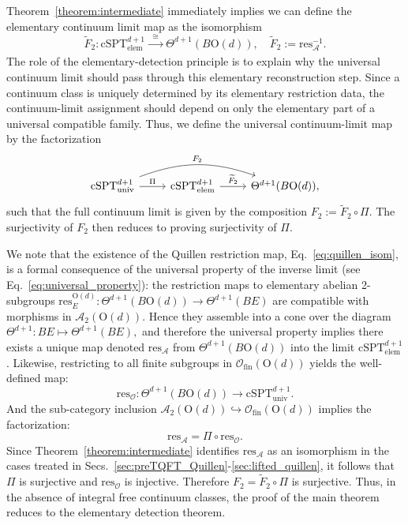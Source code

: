 \documentclass[aps,prx,reprint,superscriptaddress,twocolumn,amsmath,amssymb,amsfonts, nofootinbib]{revtex4-2}
\newcommand{\ofin}{\mathcal{O}_{\text{fin}}}
\newcommand{\qa}{\mathcal{A}_{2}}
\newcommand{\res}{\text{res}}
\theoremstyle{apsstyle}
\begin{document}
Theorem~\ref{theorem:intermediate} immediately implies we can define the elementary continuum limit map as the isomorphism
\begin{equation*}
\widetilde{F}_{2}: \mathrm{cSPT}^{d+1}_{\mathrm{elem}} \xrightarrow[]{\;\;\cong\;\;} \Theta^{d+1}(B\mathrm{O}(d)),\quad \widetilde{F}_{2}:= \res_{\mathcal{A}}^{-1}.
\end{equation*}
The role of the elementary-detection principle is to explain why the universal continuum limit should pass through this elementary reconstruction step. Since a continuum class is uniquely determined by its elementary restriction data, the continuum-limit assignment should depend on only the elementary part of a universal compatible family. Thus, we define the universal continuum-limit map by the factorization
\begin{equation}
\begin{tikzcd}
         \mathrm{cSPT}^{d+1}_{\mathrm{univ}} \arrow[r, "\Pi"] \arrow[rr,bend left=20,"F_{2}"]
        &\mathrm{cSPT}^{d+1}_{\mathrm{elem}} \arrow[r, " \widetilde{F}_{2}"] & \Theta^{d+1}(B\mathrm{O}(d)),
    \end{tikzcd}
    \label{eq:factorization}
\end{equation}
such that the full continuum limit is given by the composition $ F_{2}:= \widetilde{F}_{2}\circ \Pi$. 
The surjectivity of $F_{2}$ then reduces to proving surjectivity of $\Pi$.

\bigskip 

We note that the existence of the Quillen restriction map, Eq.~\ref{eq:quillen_isom}, is a formal consequence of the universal property of the inverse limit (see Eq.~\ref{eq:universal_property}): the restriction maps to elementary abelian 2-subgroups $\res^{\mathrm{O}(d)}_{E}: \Theta^{d+1}(B\mathrm{O}(d)) \to \Theta^{d+1}(BE)$ are compatible with morphisms in $\mathcal{A}_{2}(\mathrm{O}(d))$. Hence they assemble into a cone over the diagram $\Theta^{d+1}: BE\mapsto \Theta^{d+1}(BE),$ and therefore the universal property implies there exists a unique map denoted $\res_{\mathcal{A}}$ from $\Theta^{d+1}(B\mathrm{O}(d))$
into the limit $\mathrm{cSPT}^{d+1}_{\mathrm{elem}}$. Likewise, restricting to all finite subgroups in $\ofin(\mathrm{O}(d))$ yields the well-defined map: 
\begin{equation}
\res_{\mathcal{O}}:\Theta^{d+1}(B\mathrm{O}(d)) \to \mathrm{cSPT}^{d+1}_{\mathrm{univ}}.
\label{eq:resO_injective}
\end{equation}
And the sub-category inclusion $\qa(\mathrm{O}(d))\hookrightarrow \ofin(\mathrm{O}(d))$ implies the factorization: \begin{equation*}\res_{\mathcal{A}}= \Pi \circ \res_{\mathcal{O}}.
\end{equation*}
Since Theorem~\ref{theorem:intermediate} identifies $\res_{\mathcal A}$ as an isomorphism in the cases treated in Secs.~\ref{sec:preTQFT_Quillen}-\ref{sec:lifted_quillen}, it follows that $\Pi$ is surjective and $\res_{\mathcal O}$ is injective. Therefore $F_2=\widetilde F_2\circ \Pi$ is surjective. Thus, in the absence of integral free continuum classes, the proof of the main theorem reduces to the elementary detection theorem.
\end{document}

